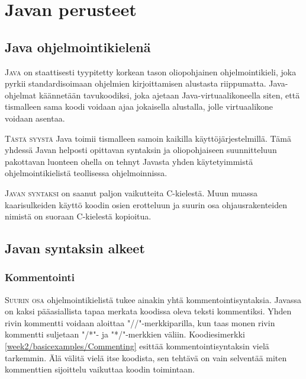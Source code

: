 \documentclass[openany]{book}
\newcommand{\newthought}[1]{\smallskip\textsc{#1}}
\begin{document}

\chapter{Javan perusteet}
\label{perusteet}	

\section{Java ohjelmointikielenä}
\label{javasta}

\newthought{Java} on staattisesti tyypitetty korkean tason oliopohjainen ohjelmointikieli, joka
pyrkii standardisoimaan ohjelmien kirjoittamisen alustasta riippumatta. Java-ohjelmat käännetään
tavukoodiksi, joka ajetaan Java-virtuaalikoneella siten, että tismalleen sama koodi voidaan ajaa
jokaisella alustalla, jolle virtuaalikone voidaan asentaa.

\newthought{Tästä syystä} Java toimii tismalleen samoin kaikilla käyttöjärjestelmillä. Tämä
yhdessä Javan helposti opittavan syntaksin ja oliopohjaiseen suunnitteluun pakottavan luonteen
ohella on tehnyt Javasta yhden käytetyimmistä ohjelmointikielistä teollisessa ohjelmoinnissa.

\newthought{Javan syntaksi} on saanut paljon vaikutteita C-kielestä. Muun muassa kaarisulkeiden
käyttö koodin osien erotteluun ja suurin osa ohjausrakenteiden nimistä on suoraan C-kielestä
kopioitua.


\section{Javan syntaksin alkeet}
\label{syntaksin alkeista}

\subsection{Kommentointi}
\label{kommentointi}

\newthought{Suurin osa} ohjelmointikielistä tukee ainakin yhtä kommentointisyntaksia. Javassa on
kaksi pääasiallista tapaa merkata koodissa oleva teksti kommentiksi. Yhden rivin kommentti voidaan
aloittaa "//"-merkkiparilla, kun taas monen rivin kommentti suljetaan "/*"- ja "*/"-merkkien
väliin. Koodiesimerkki \ref{week2/basicexamples/Commenting} esittää kommentointisyntaksin vielä
tarkemmin. Älä välitä vielä itse koodista, sen tehtävä on vain selventää miten kommenttien
sijoittelu vaikuttaa koodin toimintaan.
\end{document}
